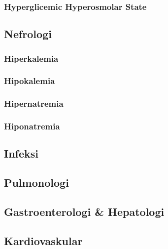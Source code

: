 \documentclass[
]{book}
\begin{document}
\hypertarget{hyperglicemic-hyperosmolar-state}{%
\subsubsection{Hyperglicemic Hyperosmolar State}\label{hyperglicemic-hyperosmolar-state}}

\hypertarget{nefrologi}{%
\subsection{Nefrologi}\label{nefrologi}}

\hypertarget{hiperkalemia}{%
\subsubsection{Hiperkalemia}\label{hiperkalemia}}

\hypertarget{hipokalemia}{%
\subsubsection{Hipokalemia}\label{hipokalemia}}

\hypertarget{hipernatremia}{%
\subsubsection{Hipernatremia}\label{hipernatremia}}

\hypertarget{hiponatremia}{%
\subsubsection{Hiponatremia}\label{hiponatremia}}

\hypertarget{infeksi}{%
\subsection{Infeksi}\label{infeksi}}

\hypertarget{pulmonologi-1}{%
\subsection{Pulmonologi}\label{pulmonologi-1}}

\hypertarget{gastroenterologi-hepatologi}{%
\subsection{Gastroenterologi \& Hepatologi}\label{gastroenterologi-hepatologi}}

\hypertarget{kardiovaskular-1}{%
\subsection{Kardiovaskular}\label{kardiovaskular-1}}
\end{document}

